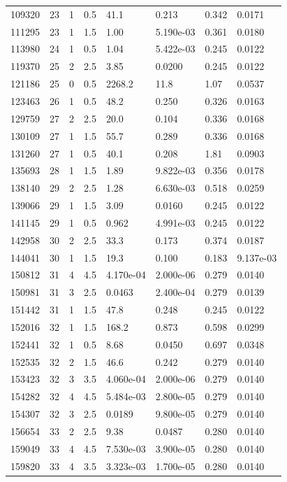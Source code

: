 \documentclass[preview]{standalone}
\begin{document}
{{{\begin{tabular}{L{1.2cm}C{1.2cm} C{0.3cm}C{0.5cm} C{1.4cm}C{1.4cm} C{1.4cm}C{1.4cm}}
  109320  &    23  & 1     & 0.5 &  41.1  & 0.213  & 0.342 &  0.0171   \\ 
  111295  &    23  & 1     & 1.5 &  1.00  & 5.190e-03  & 0.361 &  0.0180   \\ 
  113980  &    24  & 1     & 0.5 &  1.04  & 5.422e-03  & 0.245 &  0.0122   \\ 
  119370  &    25  & 2     & 2.5 &  3.85  & 0.0200  & 0.245 &  0.0122   \\ 
  121186  &    25  & 0     & 0.5 &  2268.2  & 11.8  & 1.07 &  0.0537   \\ 
  123463  &    26  & 1     & 0.5 &  48.2  & 0.250  & 0.326 &  0.0163   \\ 
  129759  &    27  & 2     & 2.5 &  20.0  & 0.104  & 0.336 &  0.0168   \\ 
  130109  &    27  & 1     & 1.5 &  55.7  & 0.289  & 0.336 &  0.0168   \\ 
  131260  &    27  & 1     & 0.5 &  40.1  & 0.208  & 1.81 &  0.0903   \\ 
  135693  &    28  & 1     & 1.5 &  1.89  & 9.822e-03  & 0.356 &  0.0178   \\ 
  138140  &    29  & 2     & 2.5 &  1.28  & 6.630e-03  & 0.518 &  0.0259   \\ 
  139066  &    29  & 1     & 1.5 &  3.09  & 0.0160  & 0.245 &  0.0122   \\ 
  141145  &    29  & 1     & 0.5 &  0.962  & 4.991e-03  & 0.245 &  0.0122   \\ 
  142958  &    30  & 2     & 2.5 &  33.3  & 0.173  & 0.374 &  0.0187   \\ 
  144041  &    30  & 1     & 1.5 &  19.3  & 0.100  & 0.183 &  9.137e-03   \\ 
  150812  &    31  & 4     & 4.5 &  4.170e-04  & 2.000e-06  & 0.279 &  0.0140   \\ 
  150981  &    31  & 3     & 2.5 &  0.0463  & 2.400e-04  & 0.279 &  0.0139   \\ 
  151442  &    31  & 1     & 1.5 &  47.8  & 0.248  & 0.245 &  0.0122   \\ 
  152016  &    32  & 1     & 1.5 &  168.2  & 0.873  & 0.598 &  0.0299   \\ 
  152441  &    32  & 1     & 0.5 &  8.68  & 0.0450  & 0.697 &  0.0348   \\ 
  152535  &    32  & 2     & 1.5 &  46.6  & 0.242  & 0.279 &  0.0140   \\ 
  153423  &    32  & 3     & 3.5 &  4.060e-04  & 2.000e-06  & 0.279 &  0.0140   \\ 
  154282  &    32  & 4     & 4.5 &  5.484e-03  & 2.800e-05  & 0.279 &  0.0140   \\ 
  154307  &    32  & 3     & 2.5 &  0.0189  & 9.800e-05  & 0.279 &  0.0140   \\ 
  156654  &    33  & 2     & 2.5 &  9.38  & 0.0487  & 0.280 &  0.0140   \\ 
  159049  &    33  & 4     & 4.5 &  7.530e-03  & 3.900e-05  & 0.280 &  0.0140   \\ 
  159820  &    33  & 4     & 3.5 &  3.323e-03  & 1.700e-05  & 0.280 &  0.0140   \\ 
\hline 
\end{tabular} 

}}}
\end{document}
